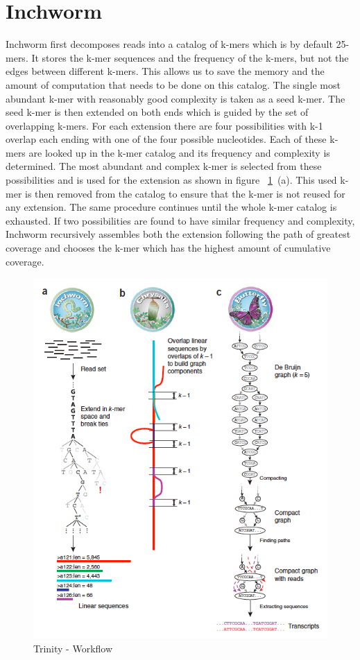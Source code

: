 \label{key}\documentclass[plainarticle, english ,zihtitle,final,hyperref,utf8]{zihpub}
\begin{document}
\section{Inchworm}
Inchworm first decomposes reads into a catalog of k-mers which is by default 25-mers. It stores the k-mer sequences and the frequency of the k-mers, but not the edges between different k-mers. This allows us to save the memory and the amount of computation that needs to be done on this catalog. The single most abundant k-mer with reasonably good complexity is taken as a seed k-mer. The seed k-mer is then extended on both ends which is guided by the set of overlapping k-mers. For each extension there are four possibilities with k-1 overlap each ending with one of the four possible nucleotides. Each of these k-mers are looked up in the k-mer catalog and its frequency and complexity is determined. The most abundant and complex k-mer is selected from these possibilities and is used for the extension as shown in figure ~\ref{trinity}~(a). This used k-mer is then removed from the catalog to ensure that the k-mer is not reused for any extension. The same procedure continues until the whole k-mer catalog is exhausted. If two possibilities are found to have similar frequency and complexity, Inchworm recursively assembles both the extension following the path of greatest coverage and chooses the k-mer which has the highest amount of cumulative coverage.
\begin{figure}[h]
\center
\includegraphics[scale=0.5]{Trinity_phases}
\caption{Trinity - Workflow}
\label{trinity}
\end{figure} 
\end{document}
